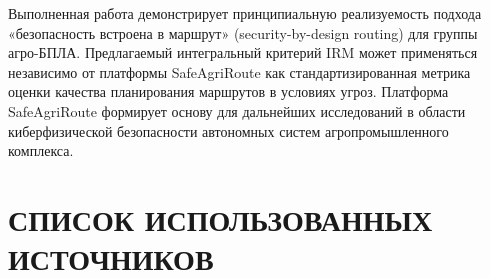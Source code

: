 \documentclass[14pt,a4paper]{extarticle}
\begin{document}
Выполненная работа демонстрирует принципиальную реализуемость подхода «безопасность встроена в маршрут» (security-by-design routing) для группы агро-БПЛА. Предлагаемый интегральный критерий IRM может применяться независимо от платформы SafeAgriRoute как стандартизированная метрика оценки качества планирования маршрутов в условиях угроз. Платформа SafeAgriRoute формирует основу для дальнейших исследований в области киберфизической безопасности автономных систем агропромышленного комплекса.


\hypertarget{ux441ux43fux438ux441ux43eux43a-ux438ux441ux43fux43eux43bux44cux437ux43eux432ux430ux43dux43dux44bux445-ux438ux441ux442ux43eux447ux43dux438ux43aux43eux432}{%
\section{СПИСОК ИСПОЛЬЗОВАННЫХ ИСТОЧНИКОВ}\label{ux441ux43fux438ux441ux43eux43a-ux438ux441ux43fux43eux43bux44cux437ux43eux432ux430ux43dux43dux44bux445-ux438ux441ux442ux43eux447ux43dux438ux43aux43eux432}}
\end{document}
